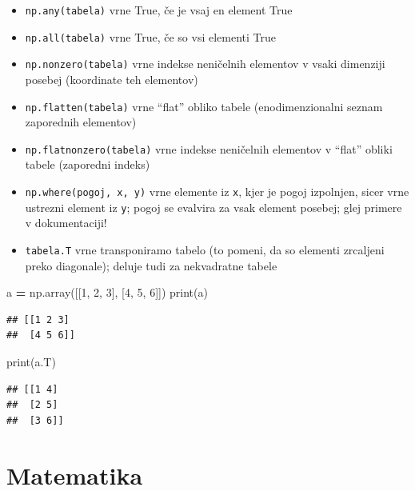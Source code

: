 \documentclass[
]{report}
\newenvironment{Shaded}{\begin{snugshade}}{\end{snugshade}}
\newcommand{\BuiltInTok}[1]{#1}
\newcommand{\DecValTok}[1]{\textcolor[rgb]{0.00,0.00,0.81}{#1}}
\newcommand{\NormalTok}[1]{#1}
\newcommand{\OperatorTok}[1]{\textcolor[rgb]{0.81,0.36,0.00}{\textbf{#1}}}
\providecommand{\tightlist}{%
  \setlength{\itemsep}{0pt}\setlength{\parskip}{0pt}}
\begin{document}
\begin{itemize}
\tightlist
\item
  \texttt{np.any(tabela)} vrne True, če je vsaj en element True
\item
  \texttt{np.all(tabela)} vrne True, če so vsi elementi True
\item
  \texttt{np.nonzero(tabela)} vrne indekse neničelnih elementov v vsaki dimenziji posebej (koordinate teh elementov)
\item
  \texttt{np.flatten(tabela)} vrne ``flat'' obliko tabele (enodimenzionalni seznam zaporednih elementov)
\item
  \texttt{np.flatnonzero(tabela)} vrne indekse neničelnih elementov v ``flat'' obliki tabele (zaporedni indeks)
\item
  \texttt{np.where(pogoj,\ x,\ y)} vrne elemente iz \texttt{x}, kjer je pogoj izpolnjen, sicer vrne ustrezni element iz \texttt{y}; pogoj se evalvira za vsak element posebej; glej primere v dokumentaciji!
\item
  \texttt{tabela.T} vrne transponiramo tabelo (to pomeni, da so elementi zrcaljeni preko diagonale); deluje tudi za nekvadratne tabele
\end{itemize}

\begin{Shaded}
\begin{Highlighting}[]
\NormalTok{a }\OperatorTok{=}\NormalTok{ np.array([[}\DecValTok{1}\NormalTok{, }\DecValTok{2}\NormalTok{, }\DecValTok{3}\NormalTok{], [}\DecValTok{4}\NormalTok{, }\DecValTok{5}\NormalTok{, }\DecValTok{6}\NormalTok{]])}
\BuiltInTok{print}\NormalTok{(a)}
\end{Highlighting}
\end{Shaded}

\begin{verbatim}
## [[1 2 3]
##  [4 5 6]]
\end{verbatim}

\begin{Shaded}
\begin{Highlighting}[]
\BuiltInTok{print}\NormalTok{(a.T)}
\end{Highlighting}
\end{Shaded}

\begin{verbatim}
## [[1 4]
##  [2 5]
##  [3 6]]
\end{verbatim}

\hypertarget{matematika}{%
\section{Matematika}\label{matematika}}
\end{document}
